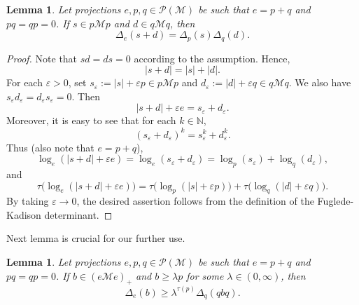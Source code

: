 \documentclass[11]{amsart}
\numberwithin{equation}{section}
\newtheorem{lemma}[theorem]{Lemma}
\newcommand{\M}{\mathcal{M}}
\begin{document}
\begin{lemma}\label{s plus d}
		Let projections $e,p,q\in\mathcal{P}(\mathcal{M})$ be such that $e=p+q$ and $pq=qp=0$. If $s\in p\mathcal{M}p$ and $d\in q\mathcal{M}q$, then
		\[\Delta_e(s+d)=\Delta_p(s)\Delta_q(d).\]
\end{lemma}
\begin{proof}
	Note that $sd=ds=0$ according to the assumption. Hence,
	$$|s+d|=|s|+|d|.$$
	For each $\varepsilon>0$, set $s_{\varepsilon}:=|s|+\varepsilon p\in p\M p$ and $d_{\varepsilon}:=|d|+\varepsilon q\in q\M q$. We also have $s_{\varepsilon}d_{\varepsilon}=d_{\varepsilon}s_{\varepsilon}=0$.
Then
		$$|s+d|+\varepsilon e=s_{\varepsilon}+d_{\varepsilon}.$$
	Moreover, it is easy to see that for each $k\in \mathbb{N}$,
	$$(s_{\varepsilon}+d_{\varepsilon})^k=s_{\varepsilon}^k+d_{\varepsilon}^k.$$
Thus (also note that $e=p+q$),
	\[\log_e(|s+d|+\varepsilon e)=\log_e(s_{\varepsilon}+d_{\varepsilon})=\log_p(s_{\varepsilon})+\log_q(d_{\varepsilon}),\]
and
		\[\tau\Big(\log_e(|s+d|+\varepsilon e)\Big)=\tau\Big(\log_p(|s|+\varepsilon p)\Big)+\tau\Big(\log_q(|d|+\varepsilon q)\Big).\]
By taking $\varepsilon\to 0$,	the desired assertion follows from  the definition of the Fuglede-Kadison determinant.
\end{proof}

Next lemma is crucial for our further use. 
\begin{lemma}\label{lem FK}
	Let projections $e,p,q\in\mathcal{P}(\mathcal{M})$ be such that $e=p+q$ and $pq=qp=0$.  If $b\in(e\mathcal Me)_+$ and
	$b\geq\lambda p$ for some $\lambda\in (0,\infty)$, then
	\[
	\Delta_e(b)\geq\lambda^{\tau(p)}\Delta_q(qbq).
	\]
\end{lemma}
\end{document}
